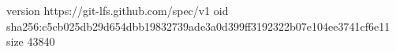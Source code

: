 version https://git-lfs.github.com/spec/v1
oid sha256:c5cb025db29d654dbb19832739ade3a0d399ff3192322b07e104ee3741cf6e11
size 43840
